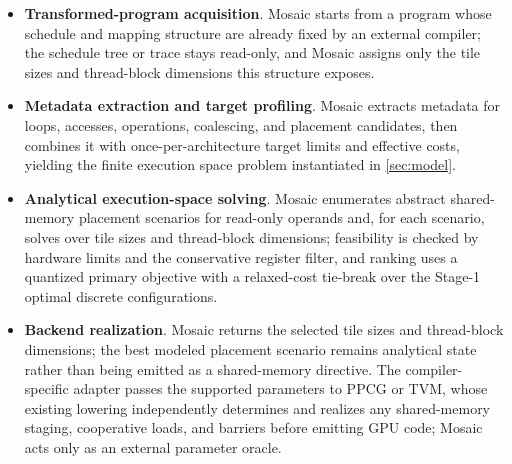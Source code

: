 \documentclass[acmsmall,review,anonymous,screen]{acmart}
\newcommand{\name}{{Mosaic}\xspace}
\begin{document}
\begingroup
\setlength{\topsep}{2pt plus 1pt minus 1pt}
\setlength{\partopsep}{0pt}
\setlength{\itemsep}{1pt plus 0.5pt minus 0.5pt}
\setlength{\parsep}{0pt}
\begin{itemize}[
  leftmargin=1.4em,
  labelsep=0.45em,
  topsep=2pt plus 1pt minus 1pt,
  partopsep=0pt,
  itemsep=1pt plus 0.5pt minus 0.5pt,
  parsep=0pt
]
  \item \textbf{Transformed-program acquisition}. \name starts from a program whose schedule and mapping structure are already fixed by an external compiler; the schedule tree or trace stays read-only, and \name assigns only the tile sizes and thread-block dimensions this structure exposes.
  \item \textbf{Metadata extraction and target profiling}. \name extracts metadata for loops, accesses, operations, coalescing, and placement candidates, then combines it with once-per-architecture target limits and effective costs, yielding the finite execution space problem instantiated in \autoref{sec:model}.
  \item \textbf{Analytical execution-space solving}. \name enumerates abstract shared-memory placement scenarios for read-only operands and, for each scenario, solves over tile sizes and thread-block dimensions; feasibility is checked by hardware limits and the conservative register filter, and ranking uses a quantized primary objective with a relaxed-cost tie-break over the Stage-1 optimal discrete configurations.
  \item \textbf{Backend realization}. \name returns the selected tile sizes and thread-block dimensions; the best modeled placement scenario remains analytical state rather than being emitted as a shared-memory directive. The compiler-specific adapter passes the supported parameters to PPCG or TVM, whose existing lowering independently determines and realizes any shared-memory staging, cooperative loads, and barriers before emitting GPU code; \name acts only as an external parameter oracle.
\end{itemize}
\endgroup
\end{document}
